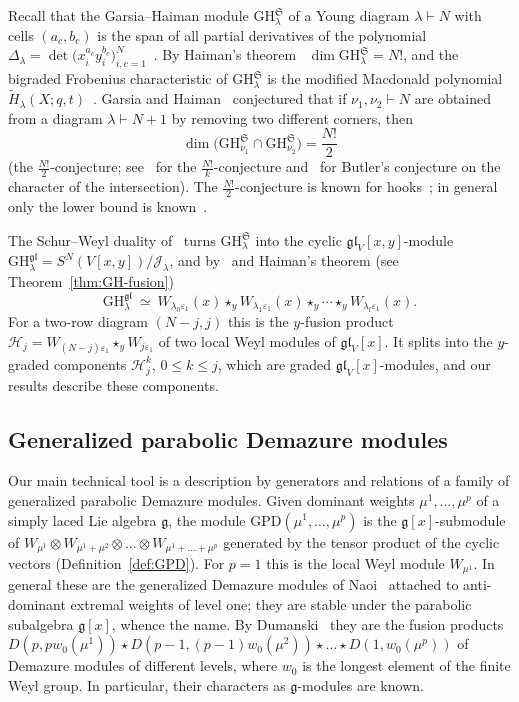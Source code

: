 \documentclass[11pt]{amsart}
\numberwithin{equation}{section}
\theoremstyle{definition}
\newcommand{\gl}{\mathfrak{gl}}
\newcommand{\fg}{\mathfrak{g}}
\newcommand{\GPD}{\mathrm{GPD}}         %
\newcommand{\GH}{\mathrm{GH}}         %
\newcommand{\eps}{\varepsilon}
\newcommand{\cJ}{\mathcal{J}}
\begin{document}
	Recall that the Garsia--Haiman module $\GH^{\mathfrak S}_\lambda$ of a Young diagram $\lambda\vdash N$ with cells $(a_c,b_c)$ is the span of all partial derivatives of the polynomial $\Delta_\lambda=\det\big(x_i^{a_c}y_i^{b_c}\big)_{i,c=1}^N$~\cite{GH}. By Haiman's theorem~\cite{Haiman} $\dim\GH^{\mathfrak S}_\lambda=N!$, and the bigraded Frobenius characteristic of $\GH^{\mathfrak S}_\lambda$ is the modified Macdonald polynomial $\widetilde H_\lambda(X;q,t)$~\cite{Hai99,Mac88}. Garsia and Haiman~\cite{GH96} conjectured that if $\nu_1,\nu_2\vdash N$ are obtained from a diagram $\lambda\vdash N+1$ by removing two different corners, then
	\[
	\dim\big(\GH^{\mathfrak S}_{\nu_1}\cap\GH^{\mathfrak S}_{\nu_2}\big)=\frac{N!}{2}
	\]
	(the $\frac{N!}2$-conjecture; see~\cite{BG} for the $\frac{N!}k$-conjecture and~\cite{But,GKX,KM} for Butler's conjecture on the character of the intersection). The $\frac{N!}2$-conjecture is known for hooks~\cite{BH,Arm}; in general only the lower bound is known~\cite{KM}.
	
	The Schur--Weyl duality of~\cite[\S3]{KM} turns $\GH^{\mathfrak S}_\lambda$ into the cyclic $\gl_V[x,y]$-module $\GH^{\gl}_\lambda=S^N(V[x,y])/\cJ_\lambda$, and by~\cite[Theorem~A]{KM} and Haiman's theorem (see Theorem~\ref{thm:GH-fusion})
	\[
	\GH^{\gl}_\lambda\ \simeq\ W_{\lambda_0\eps_1}(x)\star_yW_{\lambda_1\eps_1}(x)\star_y\cdots\star_yW_{\lambda_l\eps_1}(x).
	\]
	For a two-row diagram $(N-j,j)$ this is the $y$-fusion product $\mathcal H_j=W_{(N-j)\eps_1}\star_yW_{j\eps_1}$ of two local Weyl modules of $\gl_V[x]$. It splits into the $y$-graded components $\mathcal H_j^k$, $0\le k\le j$, which are graded $\gl_V[x]$-modules, and our results describe these components.
	
	\subsection{Generalized parabolic Demazure modules}
	
	Our main technical tool is a description by generators and relations of a family of generalized parabolic Demazure modules. Given dominant weights $\mu^1,\dots,\mu^p$ of a simply laced Lie algebra $\fg$, the module $\GPD(\mu^1,\dots,\mu^p)$ is the $\fg[x]$-submodule of $W_{\mu^1}\otimes W_{\mu^1+\mu^2}\otimes\dots\otimes W_{\mu^1+\dots+\mu^p}$ generated by the tensor product of the cyclic vectors (Definition~\ref{def:GPD}). For $p=1$ this is the local Weyl module $W_{\mu^1}$. In general these are the generalized Demazure modules of Naoi~\cite{Naoi} attached to anti-dominant extremal weights of level one; they are stable under the parabolic subalgebra $\fg[x]$, whence the name. By Dumanski~\cite{D} they are the fusion products $D(p,pw_0(\mu^1))\star D(p-1,(p-1)w_0(\mu^2))\star\dots\star D(1,w_0(\mu^p))$ of Demazure modules of different levels, where $w_0$ is the longest element of the finite Weyl group. In particular, their characters as $\fg$-modules are known.
	
\end{document}

